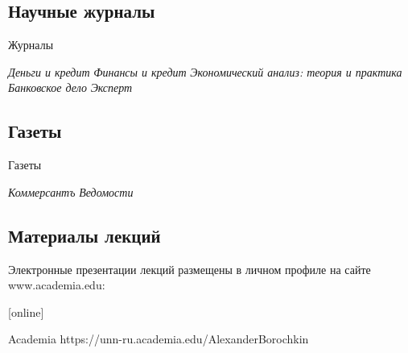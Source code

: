 \documentclass[_DKB_p1_Money.tex]{subfiles}
\begin{document}
\subsection*{Научные журналы}

\begin{frame}{Журналы}
    
  \begin{thebibliography}{10}
  
  \beamertemplatearticlebibitems
  \bibitem{}
  {\em Деньги и кредит}
  \bibitem{}
  	{\em Финансы и кредит}
  \bibitem{}
  	{\em Экономический анализ: теория и практика}
  \bibitem{}
  	{\em Банковское дело}
  \bibitem{}
  	{\em Эксперт}
  \end{thebibliography}
\end{frame}

\subsection*{Газеты}

\begin{frame}{Газеты}
    
  \begin{thebibliography}{10}
  
  \beamertemplatearticlebibitems
  \bibitem{}
  	{\em Коммерсантъ}
  \bibitem{}
  	{\em Ведомости}
  \end{thebibliography}
\end{frame}

\subsection*{Материалы лекций}
\begin{frame}
Электронные презентации лекций размещены в личном профиле на сайте www.academia.edu:
  \begin{thebibliography}{10}
  
  [online]

  Academia
    \newblock https://unn-ru.academia.edu/AlexanderBorochkin
  \end{thebibliography}
\end{frame}
\end{document}
